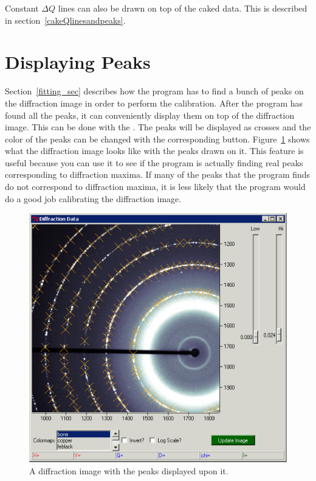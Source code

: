 Constant $\Delta Q$ 
lines can also be drawn on top of the caked data. This 
is described in section~\ref{cakeQlinesandpeaks}.

\section{Displaying Peaks}\label{displaying_peaks}

Section~\ref{fitting_sec} describes how the program has to find a bunch
of peaks on the diffraction image in order to perform the calibration.
After the program has found all the peaks, it can conveniently display
them on top of the diffraction image. This can be done with the
. The peaks will be displayed as crosses and the color
of the peaks can be changed with the corresponding  button.
Figure~\ref{peaks_on_diffraction_image} shows what the diffraction image
looks like with the peaks drawn on it. This feature is useful because 
you can use it to see if the program is actually finding real peaks
corresponding to diffraction maxima. If many of the peaks that the program 
finds do not correspond to diffraction maxima, it is less likely that 
the program would do a good job calibrating the diffraction image.

\begin{figure}
    \centering
    \includegraphics[scale=.75]{figures/peaks_on_diffraction_image.eps}
    \caption{A diffraction image with the peaks displayed upon it.}
    \label{peaks_on_diffraction_image}
\end{figure}


